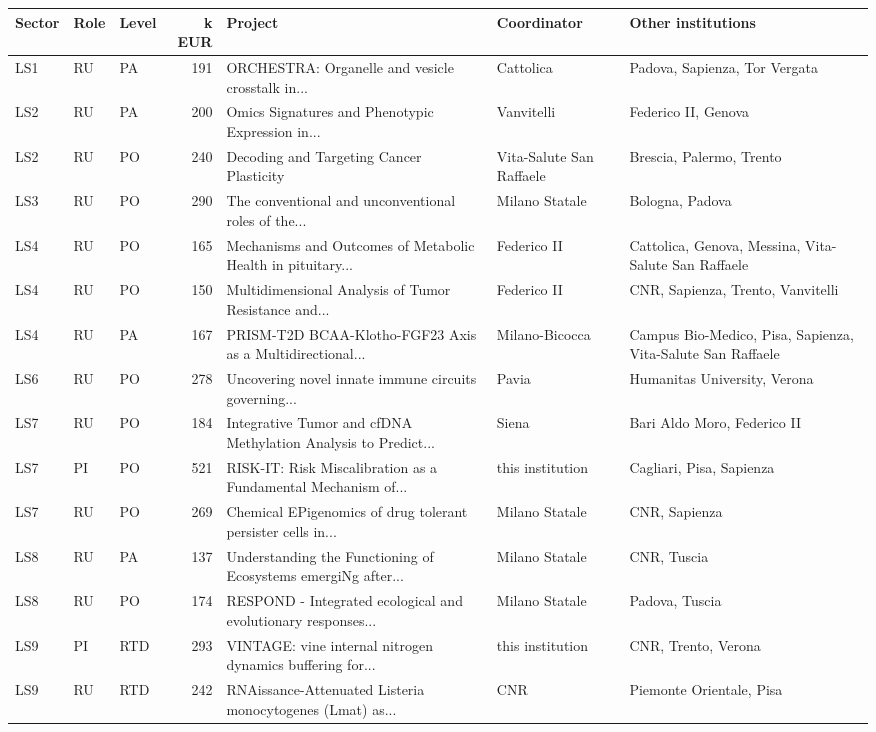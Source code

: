 \documentclass[11pt,a4paper]{article}
\begin{document}
{\footnotesize
\begin{longtable}{lllrp{4.2cm}p{2cm}p{3.2cm}}
\toprule
Sector & Role & Level & k EUR & Project & Coordinator & Other institutions \\
\midrule
\endhead
LS1 & RU & PA & 191 & ORCHESTRA: Organelle and vesicle crosstalk in... & Cattolica & Padova, Sapienza, Tor Vergata \\
LS2 & RU & PA & 200 & Omics Signatures and Phenotypic Expression in... & Vanvitelli & Federico II, Genova \\
LS2 & RU & PO & 240 & Decoding and Targeting Cancer Plasticity & Vita-Salute San Raffaele & Brescia, Palermo, Trento \\
LS3 & RU & PO & 290 & The conventional and unconventional roles of the... & Milano Statale & Bologna, Padova \\
LS4 & RU & PO & 165 & Mechanisms and Outcomes of Metabolic Health in pituitary... & Federico II & Cattolica, Genova, Messina, Vita-Salute San Raffaele \\
LS4 & RU & PO & 150 & Multidimensional Analysis of Tumor Resistance and... & Federico II & CNR, Sapienza, Trento, Vanvitelli \\
LS4 & RU & PA & 167 & PRISM-T2D BCAA-Klotho-FGF23 Axis as a Multidirectional... & Milano-Bicocca & Campus Bio-Medico, Pisa, Sapienza, Vita-Salute San Raffaele \\
LS6 & RU & PO & 278 & Uncovering novel innate immune circuits governing... & Pavia & Humanitas University, Verona \\
LS7 & RU & PO & 184 & Integrative Tumor and cfDNA Methylation Analysis to Predict... & Siena & Bari Aldo Moro, Federico II \\
LS7 & PI & PO & 521 & RISK-IT: Risk Miscalibration as a Fundamental Mechanism of... & this institution & Cagliari, Pisa, Sapienza \\
LS7 & RU & PO & 269 & Chemical EPigenomics of drug tolerant persister cells in... & Milano Statale & CNR, Sapienza \\
LS8 & RU & PA & 137 & Understanding the Functioning of Ecosystems emergiNg after... & Milano Statale & CNR, Tuscia \\
LS8 & RU & PO & 174 & RESPOND - Integrated ecological and evolutionary responses... & Milano Statale & Padova, Tuscia \\
LS9 & PI & RTD & 293 & VINTAGE: vine internal nitrogen dynamics buffering for... & this institution & CNR, Trento, Verona \\
LS9 & RU & RTD & 242 & RNAissance-Attenuated Listeria monocytogenes (Lmat) as... & CNR & Piemonte Orientale, Pisa \\

\end{longtable}}
\end{document}
